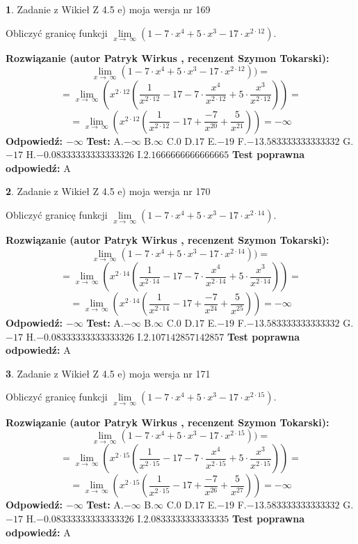 \documentclass[12pt, a4paper]{article}
\theoremstyle{definition} %
\newtheorem{zad}{}
\newcommand{\zadStart}[1]{\begin{zad}#1\newline}
\newcommand{\zadStop}{\end{zad}}
\newcommand{\rozwStart}[2]{\noindent \textbf{Rozwiązanie (autor #1 , recenzent #2): }\newline}
\newcommand{\rozwStop}{\newline}
\newcommand{\odpStart}{\noindent \textbf{Odpowiedź:}\newline}
\newcommand{\odpStop}{\newline}
\newcommand{\testStart}{\noindent \textbf{Test:}\newline}
\newcommand{\testStop}{\newline}
\newcommand{\kluczStart}{\noindent \textbf{Test poprawna odpowiedź:}\newline}
\newcommand{\kluczStop}{\newline}
\begin{document}
\zadStart{Zadanie z Wikieł Z 4.5 e) moja wersja nr 169}


Obliczyć granicę funkcji  $\lim\limits_{x\to\ \infty}(1 - 7 \cdot x^{4}+5 \cdot x^{3}- 17 \cdot x^{2\cdot12})$.
\zadStop
\rozwStart{Patryk Wirkus}{Szymon Tokarski}
$$\lim\limits_{x\to\ \infty}(1 - 7 \cdot x^{4}+5 \cdot x^{3}- 17 \cdot x^{2\cdot12}))=$$
$$=\lim\limits_{x\to\ \infty}(x^{2\cdot12}(\frac{1}{x^{2\cdot12}}-17 -7 \cdot \frac{x^{4}}{x^{2\cdot12}}+5 \cdot \frac{x^{3}}{x^{2\cdot12}}))=$$
$$=\lim\limits_{x\to\ \infty}(x^{2\cdot12}(\frac{1}{x^{2\cdot12}}-17 + \frac{-7}{x^{20}}+ \frac{5}{x^{21}}))=-\infty$$
\rozwStop
\odpStart
$-\infty$
\odpStop
\testStart
A.$-\infty$ B.$\infty$ C.$0$ D.$17$ E.$-19$
F.$-13.583333333333332$ G.$-17$
H.$-0.08333333333333326$
I.$2.1666666666666665$
\testStop
\kluczStart
A
\kluczStop



\zadStart{Zadanie z Wikieł Z 4.5 e) moja wersja nr 170}


Obliczyć granicę funkcji  $\lim\limits_{x\to\ \infty}(1 - 7 \cdot x^{4}+5 \cdot x^{3}- 17 \cdot x^{2\cdot14})$.
\zadStop
\rozwStart{Patryk Wirkus}{Szymon Tokarski}
$$\lim\limits_{x\to\ \infty}(1 - 7 \cdot x^{4}+5 \cdot x^{3}- 17 \cdot x^{2\cdot14}))=$$
$$=\lim\limits_{x\to\ \infty}(x^{2\cdot14}(\frac{1}{x^{2\cdot14}}-17 -7 \cdot \frac{x^{4}}{x^{2\cdot14}}+5 \cdot \frac{x^{3}}{x^{2\cdot14}}))=$$
$$=\lim\limits_{x\to\ \infty}(x^{2\cdot14}(\frac{1}{x^{2\cdot14}}-17 + \frac{-7}{x^{24}}+ \frac{5}{x^{25}}))=-\infty$$
\rozwStop
\odpStart
$-\infty$
\odpStop
\testStart
A.$-\infty$ B.$\infty$ C.$0$ D.$17$ E.$-19$
F.$-13.583333333333332$ G.$-17$
H.$-0.08333333333333326$
I.$2.107142857142857$
\testStop
\kluczStart
A
\kluczStop



\zadStart{Zadanie z Wikieł Z 4.5 e) moja wersja nr 171}


Obliczyć granicę funkcji  $\lim\limits_{x\to\ \infty}(1 - 7 \cdot x^{4}+5 \cdot x^{3}- 17 \cdot x^{2\cdot15})$.
\zadStop
\rozwStart{Patryk Wirkus}{Szymon Tokarski}
$$\lim\limits_{x\to\ \infty}(1 - 7 \cdot x^{4}+5 \cdot x^{3}- 17 \cdot x^{2\cdot15}))=$$
$$=\lim\limits_{x\to\ \infty}(x^{2\cdot15}(\frac{1}{x^{2\cdot15}}-17 -7 \cdot \frac{x^{4}}{x^{2\cdot15}}+5 \cdot \frac{x^{3}}{x^{2\cdot15}}))=$$
$$=\lim\limits_{x\to\ \infty}(x^{2\cdot15}(\frac{1}{x^{2\cdot15}}-17 + \frac{-7}{x^{26}}+ \frac{5}{x^{27}}))=-\infty$$
\rozwStop
\odpStart
$-\infty$
\odpStop
\testStart
A.$-\infty$ B.$\infty$ C.$0$ D.$17$ E.$-19$
F.$-13.583333333333332$ G.$-17$
H.$-0.08333333333333326$
I.$2.0833333333333335$
\testStop
\kluczStart
A
\kluczStop
\end{document}
